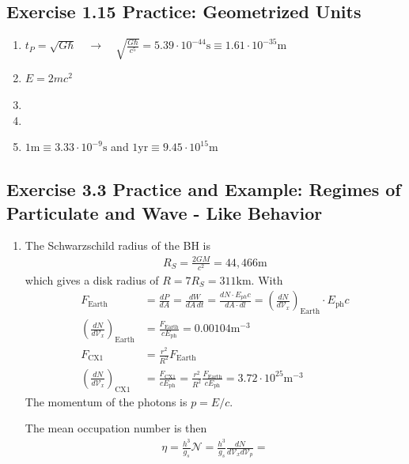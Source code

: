 \documentclass[../main.tex]{subfiles}
\begin{document}
\subsection{Exercise 1.15 Practice: Geometrized Units}
\begin{enumerate}[label=(\alph*)]
\item $t_P=\sqrt{G\hbar}\quad\rightarrow\quad\sqrt{\frac{G\hbar}{c^5}}= 5.39\cdot10^{-44}\text{s}\equiv 1.61\cdot10^{-35}\text{m}$
\item $E=2mc^2$
\item 
\item 
\item $1\text{m}\equiv 3.33\cdot10^{-9}\text{s}$ and $1\text{yr}\equiv 9.45\cdot10^{15}\text{m}$
\end{enumerate}


\subsection{Exercise 3.3 Practice and Example: Regimes of Particulate and Wave - Like Behavior}
\begin{enumerate}[label=(\alph*)]
\item The Schwarzschild radius of the BH is
\begin{align}
    R_S=\frac{2GM}{c^2}=44,466\text{m}
\end{align}
which gives a disk radius of $R=7R_S=311\text{km}$.
With
\begin{align}
    F_\text{Earth}&=\frac{dP}{dA}=\frac{dW}{dA\,dt}=\frac{dN\cdot E_{ph} c}{dA\cdot
    dl}=\left(\frac{dN}{d\mathcal{V}_x}\right)_\text{Earth}\cdot E_\text{ph} c\\
    \left(\frac{dN}{d\mathcal{V}_x}\right)_\text{Earth}&=\frac{F_\text{Earth}}{cE_\text{ph}}=0.00104\text{m}^{-3}\\
    F_\text{CX1}&=\frac{r^2}{R^2}F_\text{Earth}\\
    \left(\frac{dN}{d\mathcal{V}_x}\right)_\text{CX1}&=\frac{F_\text{CX1}}{cE_\text{ph}}=\frac{r^2}{R^2}\frac{F_\text{Earth}}{cE_\text{ph}}=3.72\cdot10^{25}\text{m}^{-3}
\end{align}
The momentum of the photons is $p=E/c$.

The mean occupation number is then
\begin{align}
    \eta=\frac{h^3}{g_s}\mathcal{N}=\frac{h^3}{g_s}\frac{dN}{d\mathcal{V}_xd\mathcal{V}_p}=
\end{align}
\end{enumerate}
\end{document}
